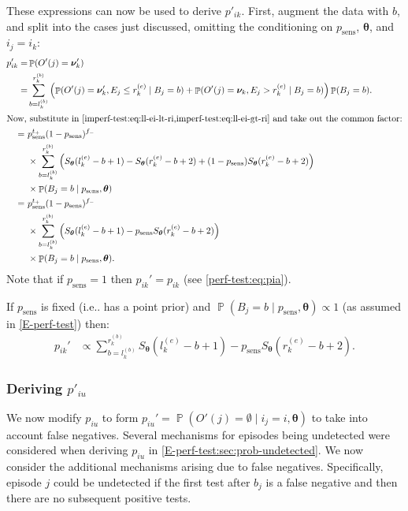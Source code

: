 \documentclass[12pt]{article}
\makeatletter
\DeclareMathOperator{\prob}{\mathbb{P}}
\renewcommand{\vec}[1]{\bm{#1}}
\newcommand{\psens}{p_\text{sens}}
\DeclareRobustCommand\onedot{\futurelet\@let@token\@onedot}
\def\@onedot{\ifx\@let@token.\else.\null\fi\xspace}
\def\ie{i.e\onedot} \def\Ie{{I.e}\onedot}
\makeatother
\begin{document}
These expressions can now be used to derive $p'_{ik}$.
First, augment the data with $b$, and split into the cases just discussed, omitting the conditioning on $\psens$, $\vec{\theta}$, and $i_j = i_k$:
\begin{align}
p_{ik}'
=& \prob(O'(j) = \vec{\nu}_k') \\
=& \sum_{b = l_k^{(b)}}^{r_k^{(b)}} \left( \prob(O'(j) = \vec{\nu}_k', E_j \leq r_k^{(e)} \mid B_j = b) + \prob(O'(j) = \vec{\nu}_k, E_j > r_k^{(e)} \mid B_j = b) \right) \prob(B_j = b). \\
\intertext{Now, substitute in \cref{imperf-test:eq:ll-ei-lt-ri,imperf-test:eq:ll-ei-gt-ri} and take out the common factor:}
=\ &  p_\text{sens}^{t_+} (1 - p_\text{sens})^{f_-} \\
 & \times \sum_{b = l_k^{(b)}}^{r_k^{(b)}} \left( S_{\vec{\theta}}(l_k^{(e)} - b + 1) - S_{\vec{\theta}}(r_k^{(e)} - b + 2) + (1 - p_\text{sens}) S_{\vec{\theta}}(r_k^{(e)} - b + 2) \right) \\ 
  & \times \prob(B_j = b \mid p_\text{sens}, \vec{\theta}) \\
=\ &  p_\text{sens}^{t_+} (1 - p_\text{sens})^{f_-} \\
  & \times \sum_{b = l_k^{(b)}}^{r_k^{(b)}} \left( S_{\vec{\theta}}(l_k^{(e)} - b + 1) - p_\text{sens} S_{\vec{\theta}}(r_k^{(e)} - b + 2) \right) \\
  & \times \prob(B_j = b \mid p_\text{sens}, \vec{\theta}).
\label{imperf-test:eq:pia-prime}
\end{align}
Note that if $p_\text{sens} = 1$ then $p_{ik}' = p_{ik}$ (see \cref{perf-test:eq:pia}).

If $\psens$ is fixed (\ie has a point prior) and $\prob(B_j = b \mid \psens, \vec{\theta}) \propto 1$ (as assumed in \cref{E-perf-test}) then:
\begin{align}
p_{ik}'
&\propto \sum_{b = l_k^{(b)}}^{r_k^{(b)}} S_{\vec{\theta}}(l_k^{(e)} - b + 1) - p_\text{sens} S_{\vec{\theta}}(r_k^{(e)} - b + 2).
\label{imperf-test:eq:pia-prime-constant}
\end{align}

\subsubsection{Deriving $p'_{iu}$} \label{imperf-test:sec:modifying-p_iu}

We now modify $p_{iu}$ to form $p_{iu}' = \prob(O'(j) = \emptyset \mid i_j = i, \vec{\theta})$ to take into account false negatives.
Several mechanisms for episodes being undetected were considered when deriving $p_{iu}$ in \cref{E-perf-test:sec:prob-undetected}.
We now consider the additional mechanisms arising due to false negatives.
Specifically, episode $j$ could be undetected if the first test after $b_j$ is a false negative and then there are no subsequent positive tests.
\end{document}
